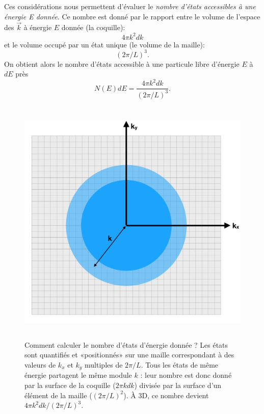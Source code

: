 Ces considérations nous permettent d'évaluer le \textit{nombre d'états accessibles à une énergie E donnée}. Ce nombre est donné par le rapport entre le volume de l'espace des $\vec k$ à énergie $E$ donnée (la coquille):
\begin{equation}
4\pi k^2 dk
\end{equation} 
et le volume occupé par un état unique (le volume de la maille):
\begin{equation}
(2\pi/L)^3.
\end{equation}
On obtient alors le nombre d'états accessible à une particule libre d'énergie $E$ à $dE$ près 
\begin{equation}
N(E)dE=\frac{4\pi k^2 dk}{(2\pi/L)^3}.
\label{e:densetat}
\end{equation}

\begin{figure}[htbp]
	\centering
		\includegraphics[height=12cm]{figs/k.png}
	\caption[Calcul de la densité d'états libres]{Comment calculer le nombre d'états d'énergie donnée ? Les états sont quantifiés et «positionnés» sur une maille correspondant à des valeurs de $k_x$ et $k_y$ multiples de $2\pi/L$. Tous les états de même énergie partagent le même module $k$ : leur nombre est donc donné par la surface de la coquille ($2\pi k dk$) divisée par la surface d'un élément de la maille ($(2\pi/L)^2$). À 3D, ce nombre devient $4 \pi k^2 dk / (2\pi/L)^3$.}
	\label{f:k}
\end{figure}

